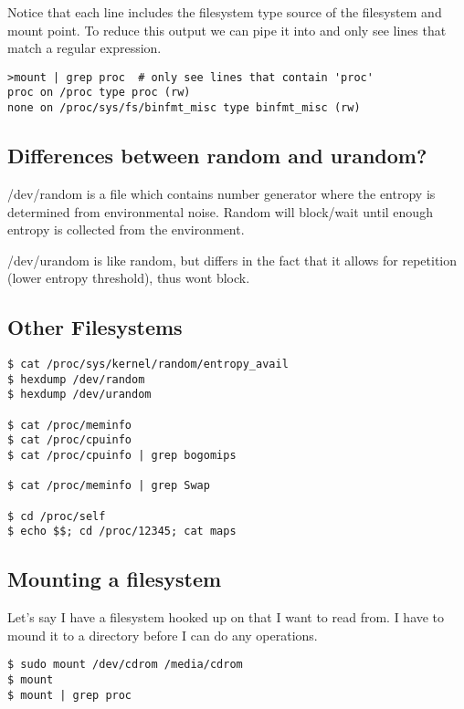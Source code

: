 Notice that each line includes the filesystem type source of the filesystem and mount point. To reduce this output we can pipe it into  and only see lines that match a regular expression.

\begin{lstlisting}
>mount | grep proc  # only see lines that contain 'proc'
proc on /proc type proc (rw)
none on /proc/sys/fs/binfmt_misc type binfmt_misc (rw)
\end{lstlisting}

\subsection{Differences between random and urandom?}\label{differences-between-random-and-urandom}

/dev/random is a file which contains number generator where the entropy is determined from environmental noise. Random will block/wait until enough entropy is collected from the environment.

/dev/urandom is like random, but differs in the fact that it allows for repetition (lower entropy threshold), thus wont block.

\subsection{Other Filesystems}\label{other-filesystems}

\begin{lstlisting}
$ cat /proc/sys/kernel/random/entropy_avail
$ hexdump /dev/random
$ hexdump /dev/urandom

$ cat /proc/meminfo
$ cat /proc/cpuinfo
$ cat /proc/cpuinfo | grep bogomips

$ cat /proc/meminfo | grep Swap

$ cd /proc/self
$ echo $$; cd /proc/12345; cat maps
\end{lstlisting}

\subsection{Mounting a filesystem}\label{mounting-a-filesystem}

Let's say I have a filesystem hooked up on  that I want to read from. I have to mound it to a directory before I can do any operations.

\begin{lstlisting}
$ sudo mount /dev/cdrom /media/cdrom
$ mount
$ mount | grep proc
\end{lstlisting}


